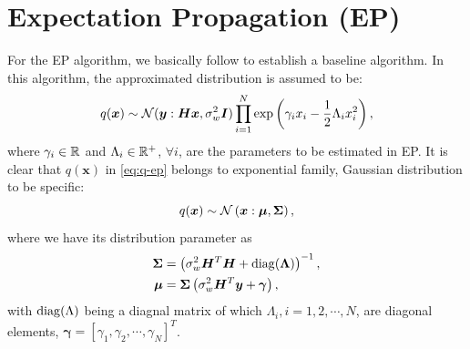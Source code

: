 \documentclass{article}
\DeclarePairedDelimiter{\diagfences}{(}{)}
\newcommand{\diag}{\operatorname{diag}\diagfences}
\begin{document}
\section{Expectation Propagation (EP)} \label{sec:EP}
For the EP algorithm, we basically follow \cite{cespedes2014mimo} to establish a baseline algorithm.
In this algorithm, the approximated distribution is assumed to be:
\begin{equation}\label{eq:q-ep}
  q(\bm{x}) \sim \mathcal{N}(\bm{y}: \bm{H}\bm{x}, \sigma_{w}^2\bm{I}) \prod_{i=1}^{N} \exp\left( \gamma_i x_i - \frac{1}{2}\Lambda_i x_i^2 \right),
\end{equation}
where $\gamma_i \in \mathbb{R}$ and $\Lambda_i \in \mathbb{R}^{+}$, $\forall i$, are the parameters to be estimated in EP. It is clear that $q(\bm{x})$ in \eqref{eq:q-ep} belongs to exponential family, Gaussian distribution to be specific:
\begin{equation}
  q(\bm{x}) \sim \mathcal{N}\left(\bm{x}:\bm{\mu}, \bm{\Sigma} \right),
\end{equation}
where we have its distribution parameter as
\begin{align}
  \bm{\Sigma} &= \left( \sigma_{w}^2\bm{H}^{T}\bm{H} +  \diag{\bm{\Lambda}} \right)^{-1}, \\
  \bm{\mu} & = \bm{\Sigma}\left( \sigma_{w}^2\bm{H}^{T}\bm{y} +  \bm{\gamma} \right),
\end{align}
with $\diag{\Lambda}$ being a diagnal matrix of which $\Lambda_i, i=1, 2, \cdots, N$, are diagonal elements, $\bm{\gamma}=[\gamma_1, \gamma_2, \cdots, \gamma_N]^{T}$.
\end{document}

